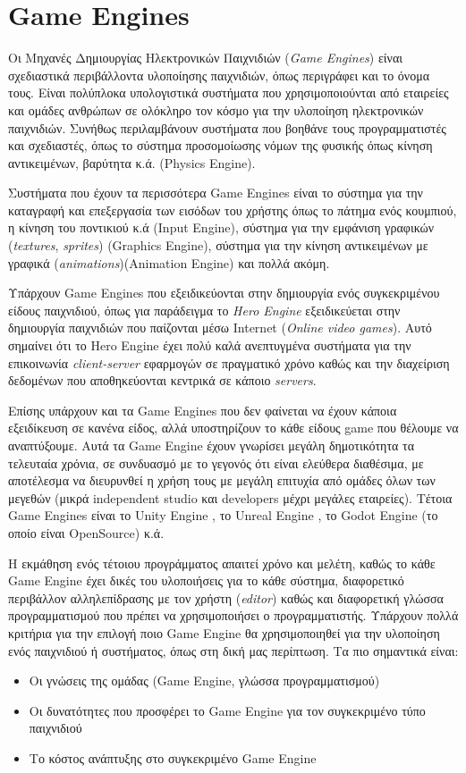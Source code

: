 \section{Game Engines}
Οι Μηχανές Δημιουργίας Ηλεκτρονικών Παιχνιδιών (\textit{Game Engines}) είναι σχεδιαστικά περιβάλλοντα υλοποίησης παιχνιδιών, όπως περιγράφει και το όνομα τους. Είναι πολύπλοκα υπολογιστικά συστήματα που χρησιμοποιούνται από εταιρείες και ομάδες ανθρώπων σε ολόκληρο τον κόσμο για την υλοποίηση ηλεκτρονικών παιχνιδιών. Συνήθως περιλαμβάνουν συστήματα που βοηθάνε τους προγραμματιστές και σχεδιαστές, όπως το σύστημα προσομοίωσης νόμων της φυσικής όπως κίνηση αντικειμένων, βαρύτητα κ.ά. (Physics Engine). \cite{gameengine}
\par
Συστήματα που έχουν τα περισσότερα Game Engines είναι το σύστημα για την καταγραφή και επεξεργασία των εισόδων του χρήστης όπως το πάτημα ενός κουμπιού, η κίνηση του ποντικιού κ.ά (Input Engine), σύστημα για την εμφάνιση γραφικών (\textit{textures}, \textit{sprites}) (Graphics Engine), σύστημα για την κίνηση αντικειμένων με γραφικά (\textit{animations})(Animation Engine) και πολλά ακόμη.
\par
Υπάρχουν Game Engines που εξειδικεύονται στην δημιουργία ενός συγκεκριμένου είδους παιχνιδιού, όπως για παράδειγμα το \textit{Hero Engine} εξειδικεύεται στην δημιουργία παιχνιδιών που παίζονται μέσω Internet (\textit{Online video games}). Αυτό σημαίνει ότι το Hero Engine έχει πολύ καλά ανεπτυγμένα συστήματα για την επικοινωνία \textit{client-server} εφαρμογών σε πραγματικό χρόνο καθώς και την διαχείριση δεδομένων που αποθηκεύονται κεντρικά σε κάποιο \textit{servers}.
\par
Επίσης υπάρχουν και τα Game Engines που δεν φαίνεται να έχουν κάποια εξειδίκευση σε κανένα είδος, αλλά υποστηρίζουν το κάθε είδους game που θέλουμε να αναπτύξουμε. Αυτά τα Game Engine έχουν γνωρίσει μεγάλη δημοτικότητα τα τελευταία χρόνια, σε συνδυασμό με το γεγονός ότι είναι ελεύθερα διαθέσιμα, με αποτέλεσμα να διευρυνθεί η χρήση τους με μεγάλη επιτυχία από ομάδες όλων των μεγεθών (μικρά independent studio και developers μέχρι μεγάλες εταιρείες). Τέτοια Game Engines είναι το Unity Engine \cite{unity}, το Unreal Engine \cite{unreal}, το Godot Engine (το οποίο είναι OpenSource) \cite{godot} κ.ά.
\par
Η εκμάθηση ενός τέτοιου προγράμματος απαιτεί χρόνο και μελέτη, καθώς το κάθε Game Engine έχει δικές του υλοποιήσεις για το κάθε σύστημα, διαφορετικό περιβάλλον αλληλεπίδρασης με τον χρήστη (\textit{editor}) καθώς και διαφορετική γλώσσα προγραμματισμού που πρέπει να χρησιμοποιήσει ο προγραμματιστής. Υπάρχουν πολλά κριτήρια για την επιλογή ποιο Game Engine θα χρησιμοποιηθεί για την υλοποίηση ενός παιχνιδιού ή συστήματος, όπως στη δική μας περίπτωση. Τα πιο σημαντικά είναι:
\begin{itemize}
  \item Οι γνώσεις της ομάδας (Game Engine, γλώσσα προγραμματισμού)
  \item Οι δυνατότητες που προσφέρει το Game Engine για τον συγκεκριμένο τύπο παιχνιδιού
  \item Το κόστος ανάπτυξης στο συγκεκριμένο Game Engine
\end{itemize}

